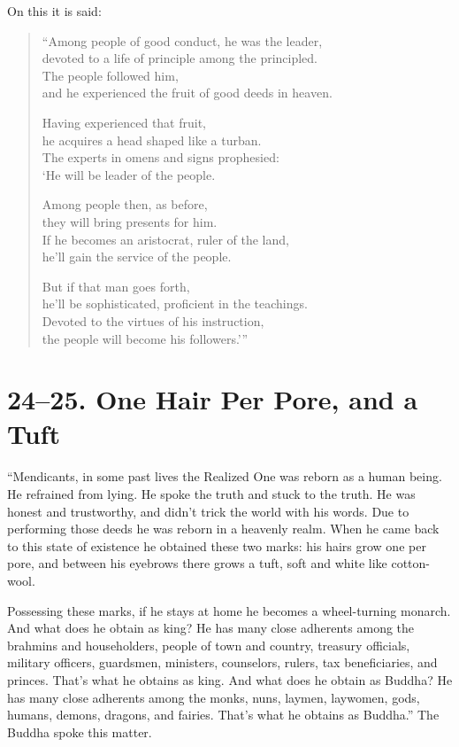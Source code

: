 \documentclass[12pt,openany]{book}%
\begin{document}
On this it is said: 

\begin{verse}%
“Among people of good conduct, he was the leader, \\
devoted to a life of principle among the principled. \\
The people followed him, \\
and he experienced the fruit of good deeds in heaven. 

Having experienced that fruit, \\
he acquires a head shaped like a turban. \\
The experts in omens and signs prophesied: \\
‘He will be leader of the people. 

Among people then, as before, \\
they will bring presents for him. \\
If he becomes an aristocrat, ruler of the land, \\
he’ll gain the service of the people. 

But if that man goes forth, \\
he’ll be sophisticated, proficient in the teachings. \\
Devoted to the virtues of his instruction, \\
the people will become his followers.’” 

%
\end{verse}

\section*{24–25. One Hair Per Pore, and a Tuft }

“Mendicants, in some past lives the Realized One was reborn as a human being. He refrained from lying. He spoke the truth and stuck to the truth. He was honest and trustworthy, and didn’t trick the world with his words. Due to performing those deeds he was reborn in a heavenly realm. When he came back to this state of existence he obtained these two marks: his hairs grow one per pore, and between his eyebrows there grows a tuft, soft and white like cotton-wool. 

Possessing these marks, if he stays at home he becomes a wheel-turning monarch. And what does he obtain as king? He has many close adherents among the brahmins and householders, people of town and country, treasury officials, military officers, guardsmen, ministers, counselors, rulers, tax beneficiaries, and princes. That’s what he obtains as king. And what does he obtain as Buddha? He has many close adherents among the monks, nuns, laymen, laywomen, gods, humans, demons, dragons, and fairies. That’s what he obtains as Buddha.” The Buddha spoke this matter. 
\end{document}
